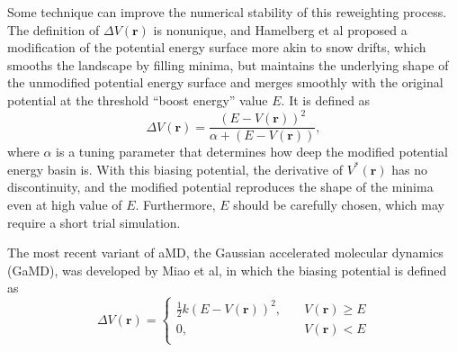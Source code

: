 Some technique can improve the numerical stability of this reweighting process.\cite{MiaoJCTC2014} The definition of $\Delta V(\mathbf{r})$ is nonunique, and Hamelberg et al proposed a modification of the potential energy surface more akin to snow drifts, which smooths the landscape by filling minima, but maintains the underlying shape of the unmodified potential energy surface and merges smoothly with the original potential at the threshold ``boost energy'' value $E$. It is defined as
\begin{equation}
	\Delta V(\mathbf{r})=\frac{(E-V(\mathbf{r}))^2}{\alpha+(E-V(\mathbf{r}))},
\end{equation}
where $\alpha$ is a tuning parameter that determines how deep the modified potential energy basin is. With this biasing potential, the derivative of $V^{\ast}(\mathbf{r})$ has no discontinuity, and the modified potential reproduces the shape of the minima even at high value of $E$. Furthermore, $E$ should be carefully chosen, which may require a short trial simulation.

The most recent variant of aMD, the Gaussian accelerated molecular dynamics (GaMD), was developed by Miao et al\cite{MiaoJCTC2015}, in which the biasing potential is defined as
\begin{equation}
	\Delta V(\mathbf{r})= 
	\left\{ 
	\begin{array}{rl} 
		\frac{1}{2}k(E-V(\mathbf{r}))^2, &\quad V(\mathbf{r})\geq E\\ 
		0, &\quad V(\mathbf{r})< E\\  
	\end{array} 
	\right.
\end{equation}

